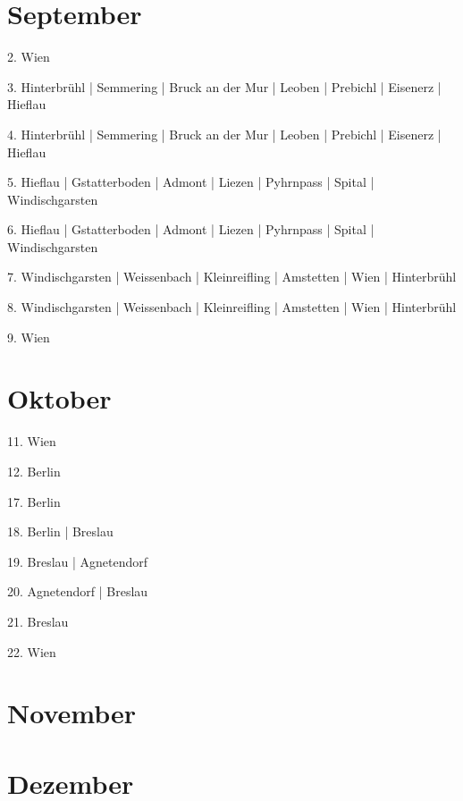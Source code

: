 \documentclass[twoside=false,titlepage=false,open=any, parskip=never, fontsize=10pt, headings=small, chapterprefix=false, appendixprefix=false, DIV=15]{scrbook}
\begin{document}
\begin{multicols}{3}
            \section*{September}
            2. Wien\par
            3. Hinterbrühl | Semmering | Bruck an der Mur | Leoben | Prebichl | Eisenerz | Hieflau\par
            4. Hinterbrühl | Semmering | Bruck an der Mur | Leoben | Prebichl | Eisenerz | Hieflau\par
            5. Hieflau | Gstatterboden | Admont | Liezen | Pyhrnpass | Spital | Windischgarsten\par
            6. Hieflau | Gstatterboden | Admont | Liezen | Pyhrnpass | Spital | Windischgarsten\par
            7. Windischgarsten | Weissenbach | Kleinreifling | Amstetten | Wien | Hinterbrühl\par
            8. Windischgarsten | Weissenbach | Kleinreifling | Amstetten | Wien | Hinterbrühl\par
            9. Wien\par
            \section*{Oktober}
            11. Wien\par
            12. Berlin\par
            17. Berlin\par
            18. Berlin | Breslau\par
            19. Breslau | Agnetendorf\par
            20. Agnetendorf | Breslau\par
            21. Breslau\par
            22. Wien\par
            \section*{November}
            \section*{Dezember}

\end{multicols}
\end{document}

